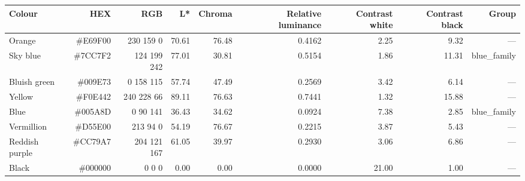 \begin{tabular}{lrrrrrrrr}
\toprule
Colour & HEX & RGB & L* & Chroma & Relative luminance & Contrast white & Contrast black & Group \\
\midrule
Orange & \#E69F00 & 230 159 0 & 70.61 & 76.48 & 0.4162 & 2.25 & 9.32 & — \\
Sky blue & \#7CC7F2 & 124 199 242 & 77.01 & 30.81 & 0.5154 & 1.86 & 11.31 & blue\_family \\
Bluish green & \#009E73 & 0 158 115 & 57.74 & 47.49 & 0.2569 & 3.42 & 6.14 & — \\
Yellow & \#F0E442 & 240 228 66 & 89.11 & 76.63 & 0.7441 & 1.32 & 15.88 & — \\
Blue & \#005A8D & 0 90 141 & 36.43 & 34.62 & 0.0924 & 7.38 & 2.85 & blue\_family \\
Vermillion & \#D55E00 & 213 94 0 & 54.19 & 76.67 & 0.2215 & 3.87 & 5.43 & — \\
Reddish purple & \#CC79A7 & 204 121 167 & 61.05 & 39.97 & 0.2930 & 3.06 & 6.86 & — \\
Black & \#000000 & 0 0 0 & 0.00 & 0.00 & 0.0000 & 21.00 & 1.00 & — \\
\bottomrule
\end{tabular}

